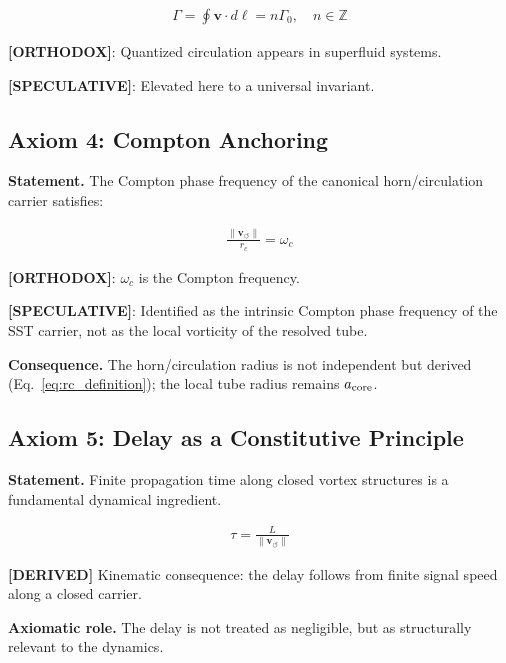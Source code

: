 \documentclass[11pt]{article}
\theoremstyle{definition}
\theoremstyle{plain}
\theoremstyle{remark}
\newcommand{\rc}{{r_c}}
\newcommand{\vnorm}{\lVert \mathbf{v}_{\!\boldsymbol{\circlearrowleft}} \rVert}
\begin{document}
        \begin{align}
            \Gamma = \oint \mathbf{v} \cdot d\ell = n \Gamma_0, \quad n \in \mathbb{Z}
        \end{align}
        
        \textbf{[ORTHODOX]}: Quantized circulation appears in superfluid systems.
        
        \textbf{[SPECULATIVE]}: Elevated here to a universal invariant.
    
    \subsection{Axiom 4: Compton Anchoring}
        
        \textbf{Statement.}
        The Compton phase frequency of the canonical horn/circulation carrier satisfies:
        
        \begin{align}
            \frac{\vnorm}{\rc} = \omega_c
        \end{align}
        
        \textbf{[ORTHODOX]}: $\omega_c$ is the Compton frequency.
        
        \textbf{[SPECULATIVE]}: Identified as the intrinsic Compton phase frequency of the SST carrier, not as the local vorticity of the resolved tube.
        
        \textbf{Consequence.}
        The horn/circulation radius is not independent but derived (Eq.~\ref{eq:rc_definition}); the local tube radius remains $a_{\rm core}$.
    
    \subsection{Axiom 5: Delay as a Constitutive Principle}
        
        \textbf{Statement.}
        Finite propagation time along closed vortex structures is a fundamental dynamical ingredient.
        
        \begin{align}
            \tau = \frac{L}{\vnorm}
        \end{align}
        
        \textbf{[DERIVED]} Kinematic consequence: the delay follows from finite signal speed along a closed carrier.

        \textbf{Axiomatic role.} The delay is not treated as negligible, but as structurally relevant to the dynamics.
        
\end{document}

